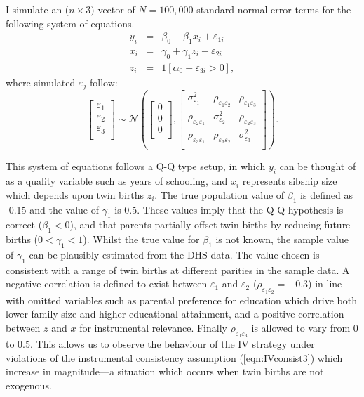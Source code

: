 \documentclass{article}[11pt,subeqn]
\begin{document}
\begin{spacing}{1.5}
I simulate an ($n \times 3)$ vector of $N=100,000$ standard normal error terms for the following system of equations.
\begin{eqnarray}
\label{eqn:MC1}
y_i&=&\beta_0+\beta_1 x_i + \varepsilon_{1i} \nonumber\\
x_i&=&\gamma_0 + \gamma_1 z_i + \varepsilon_{2i} \nonumber\\
z_i&=&1[\alpha_0+\varepsilon_{3i}>0], \nonumber
\end{eqnarray} 
where simulated $\varepsilon_j$ follow:
\begin{equation}
\begin{bmatrix}
\varepsilon_1\\
\varepsilon_2\\
\varepsilon_3\\
\end{bmatrix}
\sim \mathcal{N}
\left(\begin{bmatrix}
0\\
0\\
0\\
\end{bmatrix}
,
\begin{bmatrix}
\sigma_{\varepsilon_1}^2 &  \rho_{\varepsilon_1\varepsilon_2} &  \rho_{\varepsilon_1\varepsilon_3}\\
\rho_{\varepsilon_2\varepsilon_1} & \sigma_{\varepsilon_2}^2 &  \rho_{\varepsilon_2\varepsilon_3} \\
\rho_{\varepsilon_3\varepsilon_1}&  \rho_{\varepsilon_3\varepsilon_2}& \sigma_{\varepsilon_3}^2 \\
\end{bmatrix}\right).
\end{equation}

This system of equations follows a Q-Q type setup, in which $y_i$ can be thought of as a quality variable such as years of schooling, and $x_i$ represents
sibship size which depends upon twin births $z_i$. The true population value of $\beta_1$ is defined as -0.15 and the value of $\gamma_1$ is 0.5.  These
values imply that the Q-Q hypothesis is correct ($\beta_1<0$), and that parents partially offset twin births by reducing future births ($0<\gamma_1<1$).
Whilst the true value for $\beta_1$ is not known, the sample value of $\gamma_1$ can be plausibly estimated from the DHS data.  The  value chosen is consistent
with a range of twin births at different parities in the sample data.
A negative correlation is defined to exist between $\varepsilon_1$ and $\varepsilon_2$ ($\rho_{\varepsilon_1\varepsilon_2}=-0.3$) in line with omitted variables such as
parental preference for education which drive both lower family size and higher educational attainment, and a positive correlation between $z$ and $x$ for
instrumental relevance. %
Finally $\rho_{\varepsilon_1\varepsilon_3}$ is allowed to vary from 0 to 0.5.  This allows
us to observe the behaviour of the IV strategy under violations of the instrumental consistency assumption (\ref{eqn:IVconsist3}) which increase in magnitude---a situation
which occurs when twin births are not exogenous.


\end{spacing}
\end{document}
